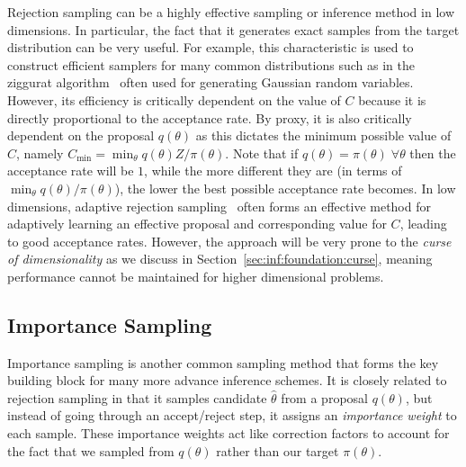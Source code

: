Rejection sampling can be a highly effective sampling or inference method in low dimensions.
In particular, the fact that it generates exact samples from the target distribution can be very
useful.  For example, this characteristic is used to construct efficient samplers for many 
common distributions such as in the ziggurat algorithm~\citep{marsaglia2000ziggurat} often
used for generating Gaussian random variables.  However, its efficiency is critically dependent
on the value of $C$ because it is directly proportional to the acceptance rate.  By proxy, it
is also critically dependent on the proposal $q(\theta)$ as this dictates the minimum possible
value of $C$, namely $C_{\min} = \min_{\theta} q(\theta) Z / \pi(\theta)$.  Note that if 
$q(\theta) = \pi(\theta) \; \forall \theta$ then the acceptance rate will be $1$, while the
more different they are (in terms of $\min_{\theta} q(\theta) / \pi(\theta)$), the lower the
best possible acceptance rate becomes.  In low dimensions, adaptive rejection 
sampling~\citep{gilks1992adaptive} often forms an effective method for adaptively 
learning an effective proposal and corresponding value for $C$, leading to good acceptance
rates.  However, the approach will be very prone to the \emph{curse of dimensionality} as
we discuss in Section~\ref{sec:inf:foundation:curse}, meaning performance cannot be
maintained for higher dimensional problems.

\subsection{Importance Sampling}
\label{sec:inf:foundation:importance}

Importance sampling is another common sampling method that forms the key building block
for many more advance inference schemes.  It is closely related to rejection sampling in that
it samples candidate $\hat{\theta}$ from a proposal $q(\theta)$, but instead of going
through an accept/reject step, it assigns an \emph{importance weight} to each sample.
These importance weights act like correction factors to account for the fact that we sampled
from $q(\theta)$ rather than our target $\pi(\theta)$.

